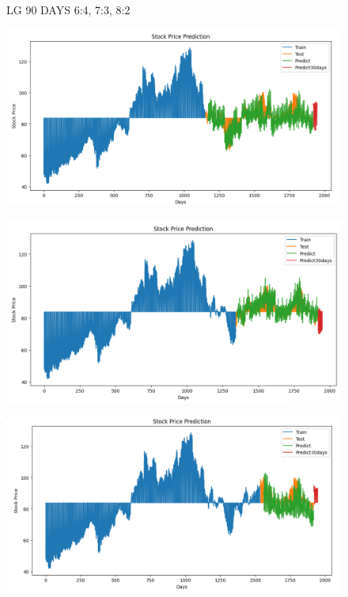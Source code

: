 \documentclass{article}
\begin{document}
\begin{multicols}{2}
\begin{figure}[H]
\begin{minipage}{0.15\textwidth}
    \label{fig:3}
    \end{minipage}
    \caption{LG 90 DAYS  6:4, 7:3, 8:2 }
\end{figure}


\begin{figure}[H]
    \centering
    \begin{minipage}{0.15\textwidth}
    \centering
    \includegraphics[width=1\textwidth]{Image/N_Beat/N_BEAT_6_4_SONY_30DAYS.png}
   
    \label{fig:1}
    \end{minipage}%
    \begin{minipage}{0.15\textwidth}
    \centering
    \includegraphics[width=1\textwidth]{Image/N_Beat/N_BEAT_7_3_SONY_30DAYS.png}
  
    \label{fig:2}
    \end{minipage}%
    \begin{minipage}{0.15\textwidth}
    \centering
    \includegraphics[width=1\textwidth]{Image/N_Beat/N_BEAT_8_2_SONY_30DAYS.png}


\end{minipage}
\end{figure}
\end{multicols}
\end{document}
